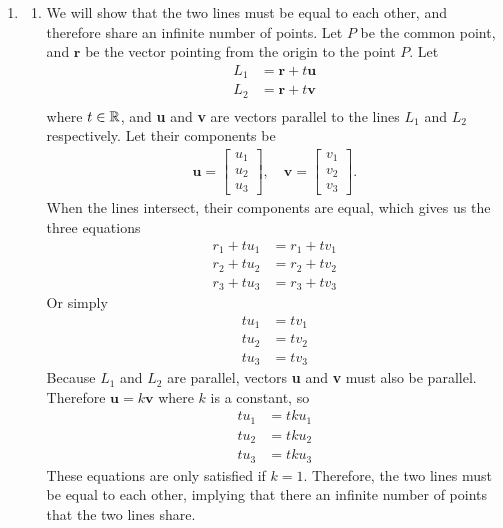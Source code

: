 \documentclass{article}
\begin{document}
\begin{enumerate}
\item
\begin{enumerate}
\item We will show that the two lines must be equal to each other, and therefore share an infinite number of points. Let $P$ be the common point, and $\mathbf{r}$ be the vector pointing from the origin to the point $P$. Let 
\begin{align*}
  L_1 &= \mathbf{r} + t\mathbf{u} \\
  L_2 &= \mathbf{r} + t\mathbf{v} \\  
\end{align*}
where $t \in \mathbb{R}$, and \textbf{u} and \textbf{v} are vectors parallel to the lines $L_1$ and $L_2$ respectively. Let their components be 
\begin{align*}
\mathbf{u} = \begin{bmatrix} u_1 \\ u_2 \\ u_3 \end{bmatrix},  \quad
\mathbf{v} = \begin{bmatrix} v_1 \\ v_2 \\ v_3 \end{bmatrix} .
\end{align*}
When the lines intersect, their components are equal, which gives us the three equations 
\begin{align*}
r_1 +t u_1 &= r_1 + tv_1 \\
r_2 +t u_2 &= r_2 + tv_2 \\
r_3 +t u_3 &= r_3 + tv_3 
\end{align*}
Or simply
\begin{align*}
t u_1 &= tv_1 \\
t u_2 &= tv_2 \\
t u_3 &= tv_3 
\end{align*}
Because $L_1$ and $L_2$ are parallel, vectors \textbf{u} and \textbf{v} must also be parallel. Therefore $\mathbf{u}=k\mathbf{v}$ where $k$ is a constant, so 
\begin{align*}
t u_1 &= tku_1 \\
t u_2 &= tku_2 \\
t u_3 &= tku_3 
\end{align*}
These equations are only satisfied if $k=1$. Therefore, the two lines must be equal to each other, implying that there an infinite number of points that the two lines share. 

\end{enumerate}
\end{enumerate}
\end{document}
